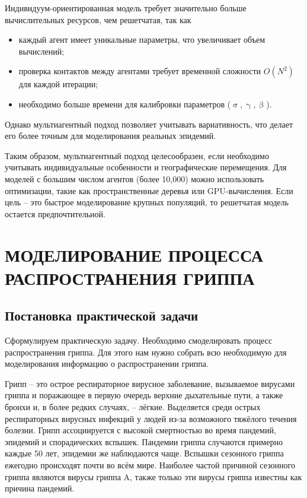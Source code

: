 \documentclass[a4paper, 14pt]{extreport}
\renewcommand{\beta}{\upbeta}
\renewcommand{\gamma}{\upgamma}
\renewcommand{\sigma}{\upsigma}
\begin{document}
	Индивидуум-ориентированная модель требует значительно больше вычислительных ресурсов, чем решетчатая, так как
	\begin{itemize}
		\item каждый агент имеет уникальные параметры, что увеличивает объем вычислений;
		\item проверка контактов между агентами требует временной сложности $O(N^2)$ для каждой итерации;
		\item необходимо больше времени для калибровки параметров ($\sigma, \gamma, \beta$).
	\end{itemize}
	
	Однако мультиагентный подход позволяет учитывать вариативность, что делает его более точным для моделирования реальных эпидемий.
	
	Таким образом, мультиагентный подход целесообразен, если необходимо учитывать индивидуальные особенности и географические перемещения. Для моделей с большим числом агентов (более 10,000) можно использовать оптимизации, такие как пространственные деревья или GPU-вычисления. Если цель -- это быстрое моделирование крупных популяций, то решетчатая модель остается предпочтительной.
	
	
	\newpage
	\chapter{МОДЕЛИРОВАНИЕ ПРОЦЕССА РАСПРОСТРАНЕНИЯ ГРИППА}
	\section{Постановка практической задачи}
	Сформулируем практическую задачу. Необходимо смоделировать процесс распространения гриппа. Для этого нам нужно собрать всю необходимую для моделирования информацию о распространении гриппа.
	
	Грипп -- это острое респираторное вирусное заболевание, вызываемое вирусами гриппа и поражающее в первую очередь верхние дыхательные пути, а также бронхи и, в более редких случаях, -- лёгкие. Выделяется среди острых респираторных вирусных инфекций у людей из-за возможного тяжёлого течения болезни. Грипп ассоциируется с высокой смертностью во время пандемий, эпидемий и спорадических вспышек. Пандемии гриппа случаются примерно каждые 50 лет, эпидемии же наблюдаются чаще. Вспышки сезонного гриппа ежегодно происходят почти во всём мире. Наиболее частой причиной сезонного гриппа являются вирусы гриппа A, также только эти вирусы гриппа известны как причина пандемий.
	
\end{document}
